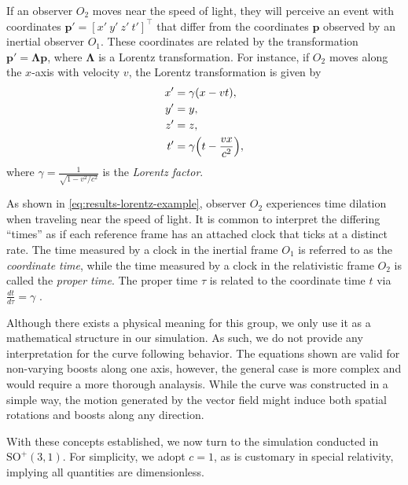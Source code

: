 If an observer $O_2$ moves near the speed of light, they will perceive an event with coordinates $\mathbf{p}' = [x'\ y'\ z'\ t']^\top$ that differ from the coordinates $\mathbf{p}$ observed by an inertial observer $O_1$. These coordinates are related by the transformation $\mathbf{p}' = \boldsymbol{\Lambda} \mathbf{p}$, where $\boldsymbol{\Lambda}$ is a Lorentz transformation. For instance, if $O_2$ moves along the $x$-axis with velocity $v$, the Lorentz transformation is given by
\begin{align}
   \begin{split}
     x' &= \gamma(x - vt),\\
     y' &= y,\\
     z'&=z,\\
     t' &= \gamma\Bigl(t - \frac{vx}{c^2}\Bigr),\label{eq:results-lorentz-example}
   \end{split}
\end{align}
where $\gamma = \frac{1}{\sqrt{1 - v^2/c^2}}$ is the \emph{Lorentz factor}.

As shown in \eqref{eq:results-lorentz-example}, observer $O_2$ experiences time dilation when traveling near the speed of light. It is common to interpret the differing ``times'' as if each reference frame has an attached clock that ticks at a distinct rate. The time measured by a clock in the inertial frame $O_1$ is referred to as the \emph{coordinate time}, while the time measured by a clock in the relativistic frame $O_2$ is called the \emph{proper time}. The proper time $\tau$ is related to the coordinate time $t$ via $\frac{dt}{d\tau} = \gamma$ \citep[p. 32]{steane2012relativity}.

Although there exists a physical meaning for this group, we only use it as a mathematical structure in our simulation. As such, we do not provide any interpretation for the curve following behavior. The equations shown are valid for non-varying boosts along one axis, however, the general case is more complex and would require a more thorough analaysis. While the curve was constructed in a simple way, the motion generated by the vector field might induce both spatial rotations and boosts along any direction.

With these concepts established, we now turn to the simulation conducted in $\text{SO}^+(3, 1)$. For simplicity, we adopt $c = 1$, as is customary in special relativity, implying all quantities are dimensionless.

